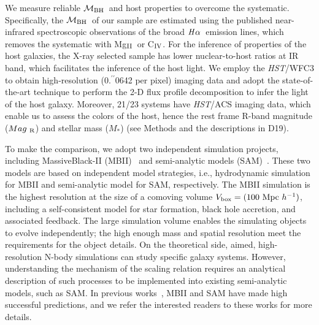 \documentclass{natureprintstyle}
\newcommand{\hst}{{\it HST}}
\newcommand{\mbh}{$\mathcal M_{\rm BH}$}
\newcommand{\mr}{$Mag_{\rm ~R}$}
\newcommand{\halpha}{${\it H}\alpha$}
\newcommand{\mstar}{{$M_*$}}
\newcommand{\Mgii}{Mg$_{\rm II}$}
\newcommand{\Civ}{C$_{\rm IV}$}
\newcommand{\farcs}{\mbox{\ensuremath{.\!\!^{\prime\prime}}}}%
\newcommand{\ding}[1]{\textcolor{red}{[{\bf Xuheng}: #1]}}
\begin{document}
We measure reliable \mbh\ and host properties to overcome the systematic. Specifically, the \mbh\ of our sample are estimated using the published near-infrared spectroscopic observations of the broad \halpha\ emission lines, which removes the systematic with \Mgii\ or \Civ. For the inference of properties of the host galaxies, the X-ray selected sample has lower nuclear-to-host ratios at IR band, which facilitates the inference of the host light. We employ the \hst/WFC3 to obtain high-resolution (0\farcs0642 per pixel) imaging data and adopt the state-of-the-art technique to perform the 2-D flux profile decomposition to infer the light of the host galaxy. Moreover, 21/23 systems have \hst/ACS imaging data, which enable us to assess the colors of the host, hence the rest frame R-band magnitude (\mr) and stellar mass (\mstar) (see Methods and the descriptions in D19). 


To make the comparison, we adopt two independent simulation projects, including MassiveBlack-II (MBII)~\cite{Khandai2015} and semi-analytic models (SAM)~\cite{Menci2014}. These two models are based on independent model strategies, i.e., hydrodynamic simulation for MBII and semi-analytic model for SAM, respectively. The MBII simulation is the highest resolution at the size of a comoving volume $V_{\rm box} = (100~{\rm Mpc}~h^{-1})$, including a self-consistent model for star formation, black hole accretion, and associated feedback. The large simulation volume enables the simulating objects to evolve independently; the high enough mass and spatial resolution meet the requirements for the object details. On the theoretical side, aimed, high-resolution N-body simulations can study specific galaxy systems. However, understanding the mechanism of the scaling relation requires an analytical description of such processes to be implemented into existing semi-analytic models, such as SAM. In previous works~\cite{Huang2018, DeG++15, Khandai2015, Bhowmick2019, Menci2014, Menci2016}, MBII and SAM have made high successful predictions, and we refer the interested readers to these works for more details.
\end{document}
